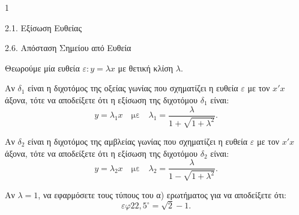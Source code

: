 \begin{ylh}{1}
    \item 2.1. Εξίσωση Ευθείας
    \item 2.6. Απόσταση Σημείου από Ευθεία
\end{ylh}
\begin{figure}
\centering
{}
\end{figure}

Θεωρούμε μία ευθεία $\varepsilon: y = \lambda x$ με θετική κλίση $\lambda$.

\begin{alist}
\item Αν $\delta_1$ είναι η διχοτόμος της οξείας γωνίας που σχηματίζει η ευθεία $\varepsilon$ με τον $x'x$ άξονα, τότε να αποδείξετε ότι η εξίσωση της διχοτόμου $\delta_1$ είναι:
    \[ y = \lambda_1 x \quad \text{με} \quad \lambda_1 = \frac{\lambda}{1+\sqrt{1+\lambda^2}}. \] 
\item Αν $\delta_2$ είναι η διχοτόμος της αμβλείας γωνίας που σχηματίζει η ευθεία $\varepsilon$ με τον $x'x$ άξονα, τότε να αποδείξετε ότι η εξίσωση της διχοτόμου $\delta_2$ είναι:
    \[ y = \lambda_2 x \quad \text{με} \quad \lambda_2 = \frac{\lambda}{1-\sqrt{1+\lambda^2}}. \] 
\item Αν $\lambda = 1$, να εφαρμόσετε τους τύπους του α) ερωτήματος για να αποδείξετε ότι:
    \[ \varepsilon\varphi 22,5^\circ = \sqrt{2} - 1. \] 
\end{alist}